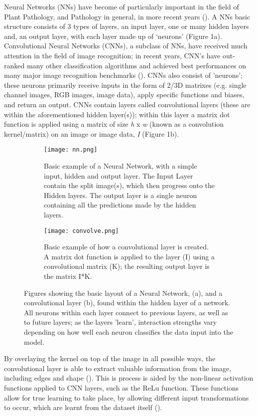 \documentclass[../../Paper.tex]{subfiles}
\begin{document}
Neural Networks (NNs) have become of particularly important in the field of Plant Pathology, and Pathology in general, in more recent years (\cite{awate_fruit_2015,
    sladojevic_deep_2016}). A NNs basic structure consists of 3 types of layers, an input
    layer, one or many hidden layers and, an output layer, with each layer made up of `neurons' (Figure 1a). Convolutional Neural Networks
    (CNNs), a subclass of NNs, have received much attention in the field of image 
    recognition; in recent years, CNN's have out-ranked many other classification algorithms 
    and achieved best performances on many major image recognition benchmarks 
    (\cite{krizhevsky_imagenet_2012, simard_best_2003}). 
    CNNs also consist of 'neurons'; these neurons primarily receive inputs in the form of 2/3D matrixes (e.g. single channel images, RGB images, image data), apply specific functions and biases, and return an output. CNNs contain layers called convolutional layers (these are within the aforementioned hidden layer(s)); within this layer a matrix dot function is applied using a matrix of size \textit{h} x \textit{w} (known as a convolution kernel/matrix) on an image or image data, \textit{I} (Figure 1b).
\begin{figure}[!t]
\centering
\begin{subfigure}{0.6\textwidth}
\texttt{[image: nn.png]}
\caption{Basic example of a Neural Network, with a simple input, hidden and output layer. The Input Layer contain the split image(s), which then progress onto the Hidden layers. The output layer is a single neuron containing all the predictions made by the hidden layers.}
\end{subfigure}
\begin{subfigure}{0.6\textwidth}
\texttt{[image: convolve.png]}
\caption{Basic example of how a convolutional layer is created. A matrix dot function is applied to the layer (I) using a convolutional matrix (K); the resulting output layer is the matrix I*K.}
\end{subfigure}
\caption{Figures showing the basic layout of a Neural Network, (a), and a convolutional layer (b), found within the hidden layer of a network. All neurons within each layer connect to previous layers, as well as to future layers; as the layers 'learn', interaction strengths vary depending on how well each neuron classifies the data input into the model.}
\end{figure}

    
    By overlaying the kernel on top of the image in all possible ways, the convolutional layer is able to extract valuable information from the image, including edges and shape (\cite{zeiler_visualizing_2014}). This is process is aided by the non-linear activation functions applied to CNN layers, such as the ReLu function. These functions allow for true learning to take place, by allowing different input transformations to occur, which are learnt from the dataset itself (\cite{punjani_deep_2015}).
\end{document}

